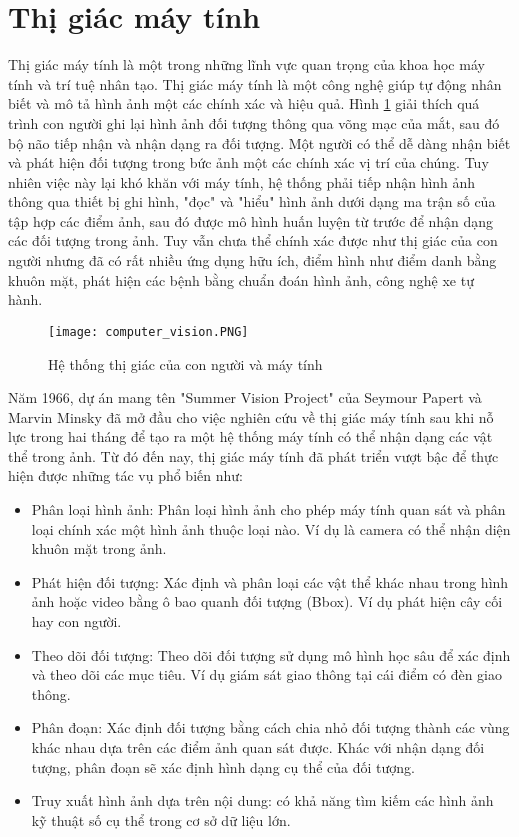 \documentclass[../the.tex]{subfiles}
\begin{document}
\section{Thị giác máy tính}
\label{sec:ttmt}

{\fontsize{13}{12}\selectfont
Thị giác máy tính là một trong những lĩnh vực quan trọng của khoa học máy tính và trí tuệ nhân tạo. Thị giác máy tính là một công nghệ giúp tự động nhân biết và mô tả hình ảnh một các chính xác và hiệu quả.
Hình \ref{fig:computer_vision} giải thích quá trình con người ghi lại hình ảnh đối tượng thông qua võng mạc của mắt,
sau đó bộ não tiếp nhận và nhận dạng ra đối tượng. Một người có thể dễ dàng nhận biết và phát hiện đối tượng trong bức ảnh một các chính xác vị trí của chúng.
Tuy nhiên việc này lại khó khăn với máy tính, hệ thống phải
tiếp nhận hình ảnh thông qua thiết bị ghi hình, "đọc" và "hiểu" hình ảnh dưới dạng ma trận số của tập hợp các điểm ảnh,
sau đó được mô hình huấn luyện từ trước để nhận dạng các đối tượng trong ảnh.
Tuy vẫn chưa thể chính xác được như thị giác của con người nhưng đã có rất nhiều ứng dụng hữu ích, điểm hình như điểm danh bằng khuôn mặt, phát hiện các bệnh bằng chuẩn đoán hình ảnh, công nghệ xe tự hành.
{\fontsize{13}{12} \selectfont
\begin{figure}[H]
	\centering
	\texttt{[image: computer\_vision.PNG]}
	\caption{Hệ thống thị giác của con người và máy tính}
	\label{fig:computer_vision}
\end{figure}}
Năm 1966, dự án mang tên "Summer Vision Project" \cite{Papert1966TheSV} của Seymour Papert và Marvin Minsky  đã mở đầu cho việc nghiên cứu về thị giác máy tính sau khi nỗ lực trong hai tháng để tạo ra một hệ thống máy tính có thể
nhận dạng các vật thể trong ảnh. Từ đó đến nay, thị giác máy tính đã phát triển vượt bậc để thực hiện được những tác vụ phổ biến như:

{\fontsize{13}{12} \selectfont
\begin{itemize}
	\item Phân loại hình ảnh: Phân loại hình ảnh cho phép máy tính quan sát và phân loại chính xác một hình ảnh thuộc loại nào.
	      Ví dụ là camera có thể nhận diện khuôn mặt trong ảnh.
	\item Phát hiện đối tượng: Xác định và phân loại các vật thể khác nhau trong hình ảnh hoặc video bằng ô bao quanh đối tượng (Bbox). Ví dụ phát hiện cây cối hay con người.
	\item Theo dõi đối tượng: Theo dõi đối tượng sử dụng mô hình học sâu để xác định và theo dõi các mục tiêu. Ví dụ giám sát giao thông tại cái điểm có đèn giao thông.
	\item Phân đoạn: Xác định đối tượng bằng cách chia nhỏ đối tượng thành các vùng khác nhau dựa trên các điểm ảnh quan sát được. Khác với nhận dạng đối tượng, phân đoạn sẽ xác định hình dạng cụ thể của đối tượng.
	\item Truy xuất hình ảnh dựa trên nội dung: có khả năng tìm kiếm các hình ảnh kỹ thuật số cụ thể trong cơ sở dữ liệu lớn.
\end{itemize}
}
\bigskip

}
\end{document}
